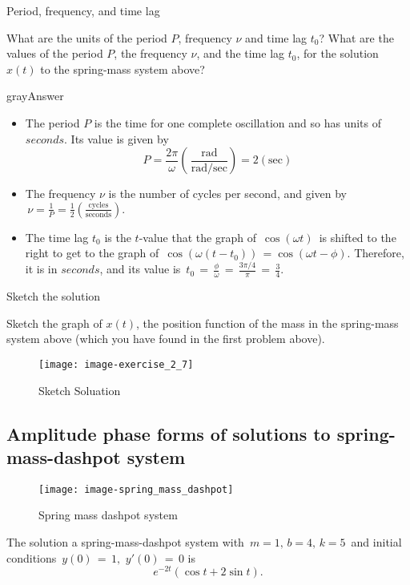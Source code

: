 \begin{exercise}
  Period, frequency, and time lag
\end{exercise}
What are the units of the period $P$, frequency $\nu$ and time lag $t_0$?
What are the values of the period $P$, the frequency $\nu$, and the time lag $t_0$,
for the solution $x(t)$ to the spring-mass system above?

\begin{mybox}{gray}{Answer}
  \begin{itemize}
  \item The period $P$ is the time for one complete oscillation and so
    has units of $seconds$. Its value is given by
    \begin{equation*}
      \displaystyle P=\frac{2\pi }{\omega }
      \left(\, \frac{\text {rad}}{\text {rad}/\text {sec}}\right)=2(\text {sec})
    \end{equation*}
  \item The frequency $\nu$ is the number of cycles per second, and given by
    $\displaystyle \, \nu =\frac{1}{P} =\frac{1}{2}
    \left(\frac{\text {cycles}}{\text {seconds}}\right).$
  \item The time lag $t_0$ is the $t$-value that the graph of $\, \cos (\omega t)\,$
    is shifted to the right to get to the graph of
    $\, \cos \left(\omega (t-t_0)\right) \, =\cos (\omega t-\phi )$.
    Therefore, it is in $seconds$, and its value is
    $\, \displaystyle t_0\, =\, \frac{\phi }{\omega }\, =\, \frac{3\pi /4}{\pi }\, =\, \frac{3}{4}.$    
  \end{itemize}
\end{mybox}

\begin{exercise}
  Sketch the solution
\end{exercise}
Sketch the graph of $x(t)$, the position function of the mass in the spring-mass system above
(which you have found in the first problem above).
\begin{figure}[ht!]
  \centering
  \texttt{[image: image-exercise\_2\_7]}
  \caption{Sketch Soluation}
\end{figure}
\clearpage

\subsection{Amplitude phase forms of solutions to spring-mass-dashpot system}
\begin{figure}[ht!]
  \centering
  \texttt{[image: image-spring\_mass\_dashpot]}
  \caption{Spring mass dashpot system}
\end{figure}
The solution a spring-mass-dashpot system with $\, m=1,\, b=4,\, k=5\,$
and initial conditions $\, y(0)\, =\, 1,\, \, y'(0)\, =\, 0$ is
\begin{equation*}
  \displaystyle  e^{-2t}\left(\cos t+2 \sin t\right).
\end{equation*}

